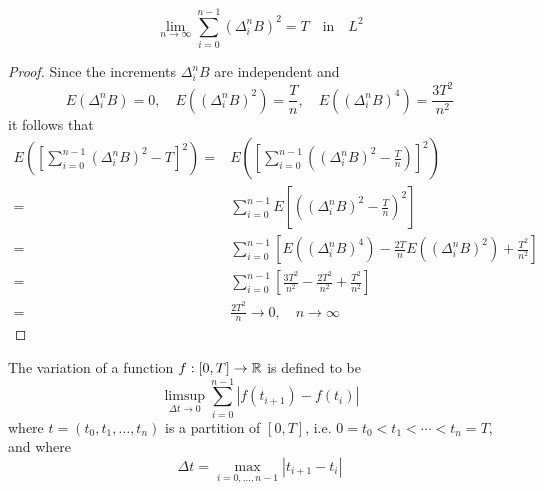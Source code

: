 \begin{theorem}\label{thm:limited-square-variation}
	\begin{equation}
		\lim_{n\rightarrow\infty}\sum_{i=0}^{n-1}\left(\Delta_{i}^{n}B\right)^{2}=T\quad\text {in}\quad L^{2}
	\end{equation}
\end{theorem}

\begin{proof}
	Since the increments \(\Delta_{i}^{n}B\) are independent and
	\begin{equation*}
		E\left(\Delta_{i}^{n}B\right)=0,\quad E\left(\left(\Delta_{i}^{n}B\right)^{2}\right)=\frac{T}{n},\quad E\left(\left(\Delta_{i}^{n}B\right)^{4}\right)=\frac{3T^{2}}{n^{2}}
	\end{equation*}
	it follows that
	\begin{equation*}
		\begin{aligned}
			E\left(\left[\sum_{i=0}^{n-1}\left(\Delta_{i}^{n}B\right)^{2}-T\right]^{2}\right)= & E\left(\left[\sum_{i=0}^{n-1}\left(\left(\Delta_{i}^{n}B\right)^{2}-\frac{T}{n}\right)\right]^{2}\right)                                                   \\
			=                                                                                  & \sum_{i=0}^{n-1}E\left[\left(\left(\Delta_{i}^{n}B\right)^{2}-\frac{T}{n}\right)^{2}\right]                                                                \\
			=                                                                                  & \sum_{i=0}^{n-1}\left[E\left(\left(\Delta_{i}^{n}B\right)^{4}\right)-\frac{2T}{n}E\left(\left(\Delta_{i}^{n}B\right)^{2}\right)+\frac{T^{2}}{n^{2}}\right] \\
			=                                                                                  & \sum_{i=0}^{n-1}\left[\frac{3T^{2}}{n^{2}}-\frac{2T^{2}}{n^{2}}+\frac{T^{2}}{n^{2}}\right]                                                                 \\
			=                                                                                  & \frac{2T^{2}}{n}\rightarrow 0,\quad n\rightarrow\infty
		\end{aligned}
	\end{equation*}
\end{proof}

\begin{definition}[Variation]
	The variation of a function \(f:[0,T]\rightarrow\mathbb{R}\) is defined to be
	\begin{equation}
		\limsup_{\Delta t\rightarrow 0}\sum_{i=0}^{n-1}\left|f\left(t_{i+1}\right)-f\left(t_{i}\right)\right|
	\end{equation}
	where \(t=\left(t_{0},t_{1},\ldots,t_{n}\right)\) is a partition of \([0,T]\), i.e. \(0=t_{0}<t_{1}<\cdots<t_{n}=T\), and where
	\begin{equation}
		\Delta t=\max_{i=0,\ldots,n-1}\left|t_{i+1}-t_{i}\right|
	\end{equation}
\end{definition}


